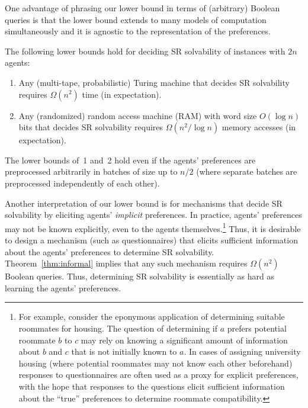 One advantage of phrasing our lower bound in terms of (arbitrary) Boolean queries is that the lower bound extends to many models of computation simultaneously and it is agnostic to the representation of the preferences.

\begin{cor}\label{cor:lb}
    The following lower bounds hold for deciding SR solvability of instances with $2n$ agents:
    \begin{enumerate}
        \item Any (multi-tape, probabilistic) Turing machine that decides SR solvability requires $\Omega(n^2)$ time (in expectation).
        \item Any (randomized) random access machine (RAM) with word size $O(\log n)$ bits that decides SR solvability requires $\Omega(n^2 / \log n)$ memory accesses (in expectation).
    \end{enumerate}
    The lower bounds of~1 and~2 hold even if the agents' preferences are preprocessed arbitrarily in batches of size up to $n/2$ (where separate batches are preprocessed independently of each other).
\end{cor}

Another interpretation of our lower bound is for mechanisms that decide SR solvability by eliciting agents' \emph{implicit} preferences. In practice, agents' preferences may not be known explicitly, even to the agents themselves.\footnote{For example, consider the eponymous application of determining suitable roommates for housing. The question of determining if $a$ prefers potential roommate $b$ to $c$ may rely on knowing a significant amount of information about $b$ and $c$ that is not initially known to $a$. In cases of assigning university housing (where potential roommates may not know each other beforehand) responses to questionnaires are often used as a proxy for explicit preferences, with the hope that responses to the questions elicit sufficient information about the ``true'' preferences to determine roommate compatibility.} Thus, it is desirable to design a mechanism (such as questionnaires) that elicits sufficient information about the agents' preferences to determine SR solvability. Theorem~\ref{thm:informal} implies that any such mechanism requires $\Omega(n^2)$ Boolean queries. Thus, determining SR solvability is essentially as hard as learning the agents' preferences.

